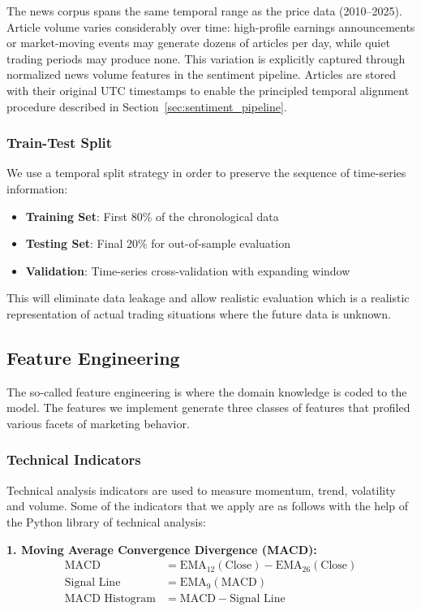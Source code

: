 The news corpus spans the same temporal range as the price data (2010--2025). Article volume varies considerably over time: high-profile earnings announcements or market-moving events may generate dozens of articles per day, while quiet trading periods may produce none. This variation is explicitly captured through normalized news volume features in the sentiment pipeline. Articles are stored with their original UTC timestamps to enable the principled temporal alignment procedure described in Section~\ref{sec:sentiment_pipeline}.

\subsubsection{Train-Test Split}

We use a temporal split strategy in order to preserve the sequence of time-series information:
\begin{itemize}
    \item \textbf{Training Set}: First 80\% of the chronological data
    \item \textbf{Testing Set}: Final 20\% for out-of-sample evaluation
    \item \textbf{Validation}: Time-series cross-validation with expanding window
\end{itemize}

This will eliminate data leakage and allow realistic evaluation which is a realistic representation of actual trading situations where the future data is unknown.

\subsection{Feature Engineering}

The so-called feature engineering is where the domain knowledge is coded to the model. The features we implement generate three classes of features that profiled various facets of marketing behavior.

\subsubsection{Technical Indicators}

Technical analysis indicators are used to measure momentum, trend, volatility and volume. Some of the indicators that we apply are as follows with the help of the Python library of technical analysis:

\textbf{1. Moving Average Convergence Divergence (MACD):}
\begin{align}
\text{MACD} &= \text{EMA}_{12}(\text{Close}) - \text{EMA}_{26}(\text{Close}) \\
\text{Signal Line} &= \text{EMA}_9(\text{MACD}) \\
\text{MACD Histogram} &= \text{MACD} - \text{Signal Line}
\end{align}

